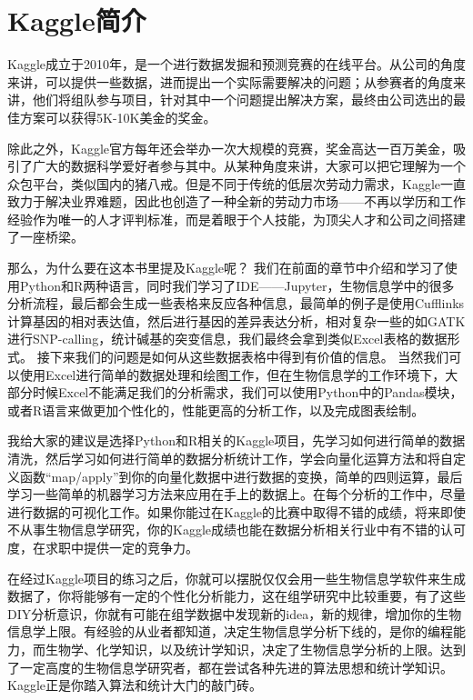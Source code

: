 \chapter{Kaggle简介}
Kaggle成立于2010年，是一个进行数据发掘和预测竞赛的在线平台。从公司的角度来讲，可以提供一些数据，进而提出一个实际需要解决的问题；从参赛者的角度来讲，他们将组队参与项目，针对其中一个问题提出解决方案，最终由公司选出的最佳方案可以获得5K-10K美金的奖金\cite{A2Mia}。

除此之外，Kaggle官方每年还会举办一次大规模的竞赛，奖金高达一百万美金，吸引了广大的数据科学爱好者参与其中。从某种角度来讲，大家可以把它理解为一个众包平台，类似国内的猪八戒。但是不同于传统的低层次劳动力需求，Kaggle一直致力于解决业界难题，因此也创造了一种全新的劳动力市场——不再以学历和工作经验作为唯一的人才评判标准，而是着眼于个人技能，为顶尖人才和公司之间搭建了一座桥梁\cite{A2Mia}。

那么，为什么要在这本书里提及Kaggle呢？
我们在前面的章节中介绍和学习了使用Python和R两种语言，同时我们学习了IDE——Jupyter，生物信息学中的很多分析流程，最后都会生成一些表格来反应各种信息，最简单的例子是使用Cufflinks计算基因的相对表达值，然后进行基因的差异表达分析，相对复杂一些的如GATK进行SNP-calling，统计碱基的突变信息，我们最终会拿到类似Excel表格的数据形式。
接下来我们的问题是如何从这些数据表格中得到有价值的信息。
当然我们可以使用Excel进行简单的数据处理和绘图工作，但在生物信息学的工作环境下，大部分时候Excel不能满足我们的分析需求，我们可以使用Python中的Pandas模块，或者R语言来做更加个性化的，性能更高的分析工作，以及完成图表绘制。

我给大家的建议是选择Python和R相关的Kaggle项目，先学习如何进行简单的数据清洗，然后学习如何进行简单的数据分析统计工作，学会向量化运算方法和将自定义函数“map/apply”到你的向量化数据中进行数据的变换，简单的四则运算，最后学习一些简单的机器学习方法来应用在手上的数据上。在每个分析的工作中，尽量进行数据的可视化工作。如果你能过在Kaggle的比赛中取得不错的成绩，将来即使不从事生物信息学研究，你的Kaggle成绩也能在数据分析相关行业中有不错的认可度，在求职中提供一定的竞争力。

在经过Kaggle项目的练习之后，你就可以摆脱仅仅会用一些生物信息学软件来生成数据了，你将能够有一定的个性化分析能力，这在组学研究中比较重要，有了这些DIY分析意识，你就有可能在组学数据中发现新的idea，新的规律，增加你的生物信息学上限。有经验的从业者都知道，决定生物信息学分析下线的，是你的编程能力，而生物学、化学知识，以及统计学知识，决定了生物信息学分析的上限。达到了一定高度的生物信息学研究者，都在尝试各种先进的算法思想和统计学知识。Kaggle正是你踏入算法和统计大门的敲门砖。